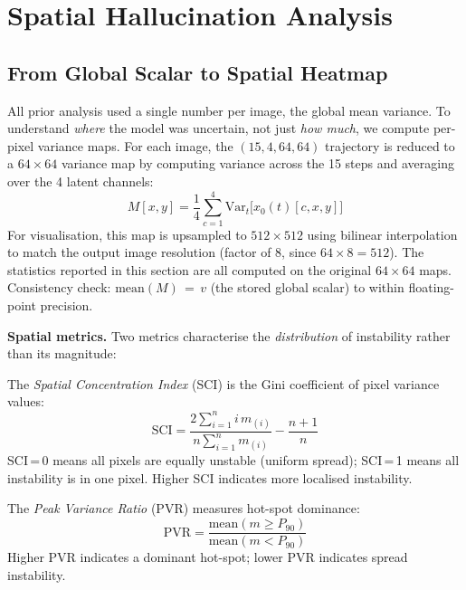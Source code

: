 \documentclass[conference]{IEEEtran}
\begin{document}
\section{Spatial Hallucination Analysis}
\label{sec:spatial}

\subsection{From Global Scalar to Spatial Heatmap}

All prior analysis used a single number per image, the global mean
variance. To understand \emph{where} the model was uncertain, not
just \emph{how much}, we compute per-pixel variance maps. For each
image, the $(15, 4, 64, 64)$ trajectory is reduced to a $64{\times}64$
variance map by computing variance across the 15 steps and averaging
over the 4 latent channels:
\begin{equation}
  M[x, y] = \frac{1}{4}\sum_{c=1}^{4}
             \text{Var}_{t}\bigl[\hat{x}_0(t)[c,x,y]\bigr]
  \label{eq:heatmap}
\end{equation}
For visualisation, this map is upsampled to $512{\times}512$ using
bilinear interpolation to match the output image resolution
(factor of 8, since $64{\times}8{=}512$). The statistics reported
in this section are all computed on the original $64{\times}64$ maps.
Consistency check: $\text{mean}(M)\,{=}\,v$ (the stored global scalar)
to within floating-point precision.

\textbf{Spatial metrics.} Two metrics characterise the
\emph{distribution} of instability rather than its magnitude:

The \emph{Spatial Concentration Index} (SCI) is the Gini coefficient
of pixel variance values:
\begin{equation}
  \text{SCI} = \frac{2\sum_{i=1}^{n} i\,m_{(i)}}{n\sum_{i=1}^{n} m_{(i)}}
               - \frac{n+1}{n}
  \label{eq:sci}
\end{equation}
SCI\,=\,0 means all pixels are equally unstable (uniform spread);
SCI\,=\,1 means all instability is in one pixel. Higher SCI indicates
more localised instability.

The \emph{Peak Variance Ratio} (PVR) measures hot-spot dominance:
\begin{equation}
  \text{PVR} = \frac{\text{mean}(m \geq P_{90})}{\text{mean}(m < P_{90})}
  \label{eq:pvr}
\end{equation}
Higher PVR indicates a dominant hot-spot; lower PVR indicates spread
instability.
\end{document}
